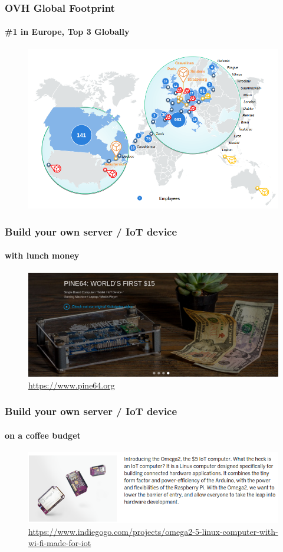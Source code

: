 \documentclass{beamer}
\begin{document}
	\begin{frame}
	\frametitle{OVH Global Footprint}
	\framesubtitle{\#1 in Europe, Top 3 Globally}
	        \begin{figure}[h]
                \centering
                \includegraphics[width=.8\textwidth]{./images/OVH-global_presence}
        	\end{figure}
	\end{frame}

	\begin{frame}
	\frametitle{Build your own server / IoT device}
	\framesubtitle{with lunch money}
	        \begin{figure}[h]
                \centering
                \includegraphics[width=.8\textwidth]{./images/pine64}
		\caption{\url{https://www.pine64.org}}
        	\end{figure}
	\end{frame}

	\begin{frame}
	\frametitle{Build your own server / IoT device}
	\framesubtitle{on a coffee budget}
	        \begin{figure}[h]
                \centering
                \includegraphics[width=.8\textwidth]{./images/Omega2}
		\caption{\tiny{\url{https://www.indiegogo.com/projects/omega2-5-linux-computer-with-wi-fi-made-for-iot}}}
        	\end{figure}
	\end{frame}
\end{document}
